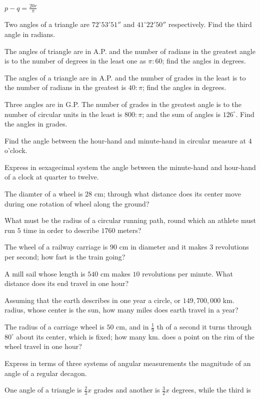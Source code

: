     \item $p - q = \frac{20r}{\pi}$
  \stopitemize
\item Two angles of a triangle are $72^{\circ}53'51''$ and $41^{\circ}22'50''$ respectively. Find the third angle in
    radians.
\item The angles of triangle are in A.P. and the number of radians in the greatest angle is to the number of degrees in the least one
    as $\pi:60$; find the angles in degrees.
\item The angles of a triangle are in A.P. and the number of grades in the least is to the number of radians in the greatest is
$40:\pi$; find the angles in degrees.
\item Three angles are in G.P. The number of grades in the greatest angle is to the number of circular units in the least is
    $800:\pi$; and the sum of angles is $126^\circ$. Find the angles in grades.
\item Find the angle between the hour-hand and minute-hand in circular measure at $4$ o'clock.
\item Express in sexagecimal system the angle between the minute-hand and hour-hand of a clock at quarter to twelve.
\item The diamter of a wheel is $28$ cm; through what distance does its center move during one rotation of wheel along the
    ground?
\item What must be the radius of a circular running path, round which an athlete must run $5$ time in order to describe
    $1760$ meters?
\item The wheel of a railway carriage is $90$ cm in diameter and it makes $3$ revolutions per second; how fast is the
    train going?
\item A mill sail whose length is $540$ cm makes $10$ revolutions per minute. What distance does its end travel in one
    hour?
\item Assuming that the earth describes in one year a circle, or $149,700,000$ km. radius, whose center is the sun, how many
    miles does earth travel in a year?
\item The radius of a carriage wheel is $50$ cm, and in $\frac{1}{9}$ th of a second it turns through $80^\circ$
    about its center, which is fixed; how many km. does a point on the rim of the wheel travel in one hour?
\item Express in terms of three systems of angular measurements the magnitude of an angle of a regular decagon.
\item One angle of a triangle is $\frac{2}{3}x$ grades and another is $\frac{3}{2}x$ degrees, while the third is
